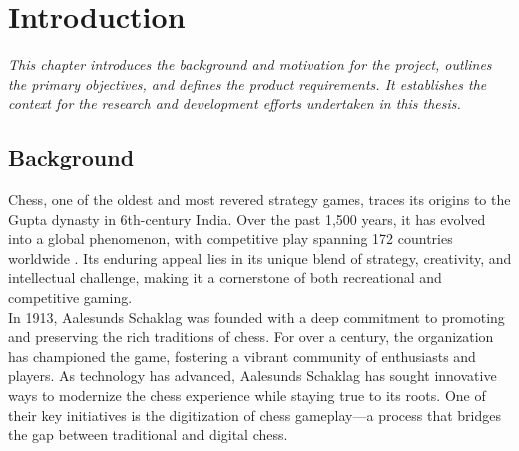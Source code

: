 \chapter{Introduction}

\begin{center}
    \textit{This chapter introduces the background and motivation for the project, outlines the primary objectives, and defines the product requirements. It establishes the context for the research and development efforts undertaken in this thesis.}   
\end{center}

\section{Background}


Chess, one of the oldest and most revered strategy games, traces its origins to the Gupta dynasty in 6th-century India. Over the past 1,500 years, it has evolved into a global phenomenon, with competitive play spanning 172 countries worldwide \cite{artsnculture}. Its enduring appeal lies in its unique blend of strategy, creativity, and intellectual challenge, making it a cornerstone of both recreational and competitive gaming. \\

In 1913, Aalesunds Schaklag was founded with a deep commitment to promoting and preserving the rich traditions of chess. For over a century, the organization has championed the game, fostering a vibrant community of enthusiasts and players. As technology has advanced, Aalesunds Schaklag has sought innovative ways to modernize the chess experience while staying true to its roots. One of their key initiatives is the digitization of chess gameplay—a process that bridges the gap between traditional and digital chess. \\


